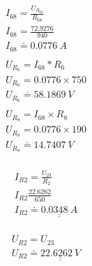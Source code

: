 \begin{figure}[t]
    \begin{gather*}
        I_{68} = \frac{U_{R_{68}}}{R_{68}} \\
        I_{68} = \frac{72.9276}{940} \\
        I_{68} \doteq 0.0776 \: A \\
        \\
        U_{R_6}= I_{68} * R_6 \\
        U_{R_6}= 0.0776 \times 750 \\
        U_{R_6} \doteq 58.1869 \: V \\
        \\
        U_{R_8} = I_{68} \times R_8 \\
        U_{R_8} = 0.0776 \times 190 \\
        U_{R_8} \doteq 14.7407 \: V \\
    \end{gather*}
\end{figure}


\begin{figure}[t]
    \begin{gather*}
        I_{R2} = \frac{U_{23}}{R_2} \\
        I_{R2}  \frac{22.6262}{650} \\
        I_{R2} \doteq \underline{\underline{0.0348 \: A}} \\
    \end{gather*}
\end{figure}

\begin{figure}[t]
    \begin{gather*}
        U_{R2} = U_{23} \\
        U_{R2} \doteq \underline{\underline{22.6262 \: V}} \\
    \end{gather*}
\end{figure}

\clearpage